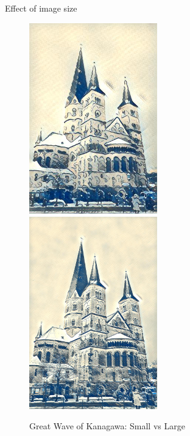 \documentclass{beamer}
\begin{document}
    \begin{frame}{Effect of image size}

        \begin{figure}
            \includegraphics[width=0.495\textwidth, height=0.7\textheight]{small}
            \hfill
            \includegraphics[width=0.495\textwidth, height=0.7\textheight]{large}
            \caption{\label{fig:clutter}Great Wave of Kanagawa: Small vs Large}
        \end{figure}

    \end{frame}
\end{document}
